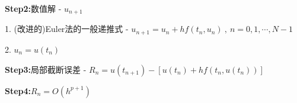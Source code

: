         \hspace*{2em} \textbf{Step2:}\quad 数值解 - $u_{n + 1}$

            \hspace*{4em} 1. (改进的)Euler法的一般递推式 - $u_{n + 1} = u_{n} + h f(t_{n}, u_{n})\ , \ n = 0, 1, \cdots, N - 1$

            \hspace*{4em} 2. \colorbox{red!20}{$\displaystyle u_{n} = u(t_{n})$}

        \hspace*{2em} \textbf{Step3:}\quad 局部截断误差 - $R_{n} = u(t_{n + 1}) - \left[u(t_{n}) + h f(t_{n}, u(t_{n}))\right]$

        \hspace*{2em} \textbf{Step4:}\quad $R_{n} = O(h^{p + 1})$
